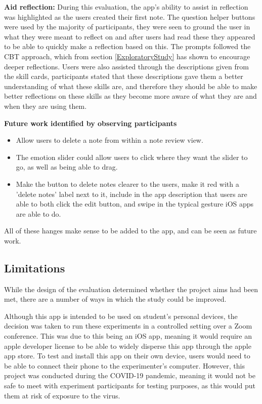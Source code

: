 \documentclass{l4proj}
\begin{document}
\textbf{Aid reflection:} During this evaluation, the app's ability to assist in reflection was highlighted as the users created their first note. The question helper buttons were used by the majority of participants, they were seen to ground the user in what they were meant to reflect on and after users had read these they appeared to be able to quickly make a reflection based on this. The prompts followed the CBT approach, which from section \ref{ExploratoryStudy} has shown to encourage deeper reflections. Users were also assisted through the descriptions given from the skill cards, participants stated that these descriptions gave them a better understanding of what these skills are, and therefore they should be able to make better reflections on these skills as they become more aware of what they are and when they are using them.

\textbf{Future work identified by observing participants}
\begin{itemize}
    \item Allow users to delete a note from within a note review view.
    \item The emotion slider could allow users to click where they want the slider to go, as well as being able to drag.
    \item Make the button to delete notes clearer to the users, make it red with a 'delete notes' label next to it, include in the app description that users are able to both click the edit button, and swipe in the typical gesture iOS apps are able to do.
\end{itemize}
All of these hanges make sense to be added to the app, and can be seen as future work.


\subsection{Limitations}

While the design of the evaluation determined whether the project aims had been met, there are a number of ways in which the study could be improved.

Although this app is intended to be used on student's personal devices, the decision was taken to run these experiments in a controlled setting over a Zoom conference. This was due to this being an iOS app, meaning it would require an apple developer license to be able to widely disperse this app through the apple app store. To test and install this app on their own device, users would need to be able to connect their phone to the experimenter's computer. However, this project was conducted during the COVID-19 pandemic, meaning it would not be safe to meet with experiment participants for testing purposes, as this would put them at risk of exposure to the virus. 
\end{document}
